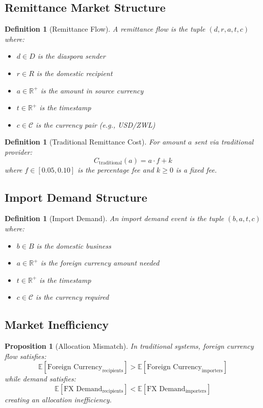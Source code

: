\documentclass[12pt]{article}
\newtheorem{definition}[theorem]{Definition}
\newtheorem{proposition}[theorem]{Proposition}
\begin{document}
\subsection{Remittance Market Structure}

\begin{definition}[Remittance Flow]
A remittance flow is the tuple $(d, r, a, t, c)$ where:
\begin{itemize}
    \item $d \in D$ is the diaspora sender
    \item $r \in R$ is the domestic recipient
    \item $a \in \mathbb{R}^+$ is the amount in source currency
    \item $t \in \mathbb{R}^+$ is the timestamp
    \item $c \in \mathcal{C}$ is the currency pair (e.g., USD/ZWL)
\end{itemize}
\end{definition}

\begin{definition}[Traditional Remittance Cost]
For amount $a$ sent via traditional provider:
$$
C_{\text{traditional}}(a) = a \cdot f + k
$$
where $f \in [0.05, 0.10]$ is the percentage fee and $k \geq 0$ is a fixed fee.
\end{definition}

\subsection{Import Demand Structure}

\begin{definition}[Import Demand]
An import demand event is the tuple $(b, a, t, c)$ where:
\begin{itemize}
    \item $b \in B$ is the domestic business
    \item $a \in \mathbb{R}^+$ is the foreign currency amount needed
    \item $t \in \mathbb{R}^+$ is the timestamp
    \item $c \in \mathcal{C}$ is the currency required
\end{itemize}
\end{definition}

\subsection{Market Inefficiency}

\begin{proposition}[Allocation Mismatch]
In traditional systems, foreign currency flow satisfies:
$$
\mathbb{E}[\text{Foreign Currency}_{\text{recipients}}] > \mathbb{E}[\text{Foreign Currency}_{\text{importers}}]
$$
while demand satisfies:
$$
\mathbb{E}[\text{FX Demand}_{\text{recipients}}] < \mathbb{E}[\text{FX Demand}_{\text{importers}}]
$$
creating an allocation inefficiency.
\end{proposition}
\end{document}
